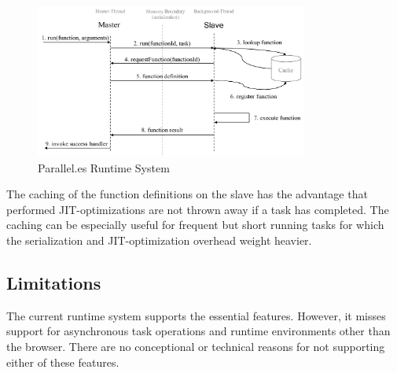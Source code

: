 \begin{figure}
	\centering
	\includegraphics[width=0.8\textwidth]{runtime-system.pdf}

	\caption{Parallel.es Runtime System}
	\label{fig:runtime-system}
\end{figure}

The caching of the function definitions on the slave has the advantage that performed JIT-optimizations are not thrown away if a task has completed. The caching can be especially useful for frequent but short running tasks for which the serialization and JIT-optimization overhead weight heavier.


\subsection{Limitations}
The current runtime system supports the essential features. However, it misses support for asynchronous task operations and runtime environments other than the browser. There are no conceptional or technical reasons for not supporting either of these features. 